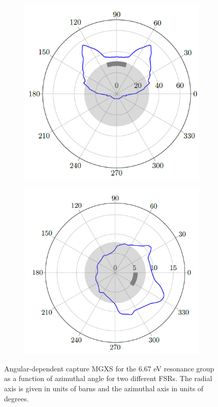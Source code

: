 \begin{figure}[h]
\begin{subfigure}{.45\textwidth}
  \centering
  \includegraphics[width=0.9\linewidth]{figures/batman-1}
  \caption{}
  \label{fig:batman-plots-a}
\end{subfigure}
\begin{subfigure}{.45\textwidth}
  \centering
  \includegraphics[width=0.9\linewidth]{figures/batman-2}
  \caption{}
  \label{fig:batman-plots-b}
\end{subfigure}
\caption{Angular-dependent capture MGXS for the 6.67 eV resonance group as a function of azimuthal angle for two different FSRs. The radial axis is given in units of barns and the azimuthal axis in units of degrees.}
\label{fig:batman-plots}
\end{figure}
